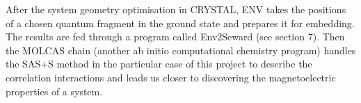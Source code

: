 \documentclass[10pt]{article}
\begin{document}
After the system geometry optimisation in CRYSTAL, ENV takes the positions of a chosen quantum fragment in the ground state and prepares it for embedding. The results are fed through a program called Env2Seward (see section 7). Then the MOLCAS chain (another ab initio computational chemistry program) handles the SAS+S method in the particular case of this project to describe the correlation interactions and leads us closer to discovering the magnetoelectric properties of a system. 



\end{document}
